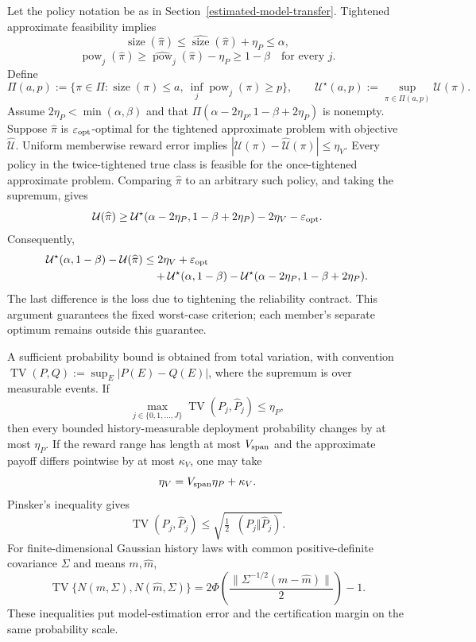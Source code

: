 \documentclass[11pt]{article}
\numberwithin{equation}{section}
\theoremstyle{plain}
\theoremstyle{definition}
\theoremstyle{remark}
\DeclareMathOperator{\KL}{D_{\mathrm{KL}}}
\begin{document}
Let the policy notation be as in Section~\ref{estimated-model-transfer}.  Tightened approximate feasibility implies
\[
\operatorname{size}(\widehat\pi)
\le
\widehat{\operatorname{size}}(\widehat\pi)+\eta_P
\le\alpha,
\]
\[
\operatorname{pow}_j(\widehat\pi)
\ge
\widehat{\operatorname{pow}}_j(\widehat\pi)-\eta_P
\ge1-\beta
\quad\text{for every }j.
\]
Define
\[
\Pi(a,p):=\{\pi\in\Pi:\operatorname{size}(\pi)\le a,
\ \inf_j\operatorname{pow}_j(\pi)\ge p\},
\qquad
\mathcal U^\star(a,p):=\sup_{\pi\in\Pi(a,p)}\mathcal U(\pi).
\]
Assume $2\eta_P<\min(\alpha,\beta)$ and that
$\Pi(\alpha-2\eta_P,1-\beta+2\eta_P)$ is nonempty.
Suppose $\widehat\pi$ is $\varepsilon_{\rm opt}$-optimal for the tightened approximate problem with objective $\widehat{\mathcal U}$. Uniform memberwise reward error implies
$|\mathcal U(\pi)-\widehat{\mathcal U}(\pi)|\le\eta_V$.
Every policy in the twice-tightened true class is feasible for the once-tightened approximate problem. Comparing $\widehat\pi$ to an arbitrary such policy, and taking the supremum, gives
\[
\mathcal U(\widehat\pi)
\ge\mathcal U^\star(\alpha-2\eta_P,1-\beta+2\eta_P)
-2\eta_V-\varepsilon_{\rm opt}.
\]
Consequently,
\begin{align*}
\mathcal U^\star(\alpha,1-\beta)-\mathcal U(\widehat\pi)
&\le 2\eta_V+\varepsilon_{\rm opt}\\
&\quad+\mathcal U^\star(\alpha,1-\beta)
-\mathcal U^\star(\alpha-2\eta_P,1-\beta+2\eta_P).
\end{align*}
The last difference is the loss due to tightening the reliability contract. This argument guarantees the fixed worst-case criterion; each member's separate optimum remains outside this guarantee.

A sufficient probability bound is obtained from total variation, with convention $\operatorname{TV}(P,Q):=\sup_E|P(E)-Q(E)|$, where the supremum is over measurable events. If
\[
\max_{j\in\{0,1,\ldots,J\}}\operatorname{TV}(P_j,\widehat P_j)\le\eta_P,
\]
then every bounded history-measurable deployment probability changes by at most $\eta_P$.  If the reward range has length at most $V_{\rm span}$ and the approximate payoff differs pointwise by at most $\kappa_V$, one may take
\[
\eta_V=V_{\rm span}\eta_P+\kappa_V.
\]
Pinsker's inequality gives
\[
\operatorname{TV}(P_j,\widehat P_j)
\le
\sqrt{\tfrac12\KL(P_j\Vert\widehat P_j)}.
\]
For finite-dimensional Gaussian history laws with common positive-definite covariance $\Sigma$ and means $m,\widehat m$,
\[
\operatorname{TV}\{N(m,\Sigma),N(\widehat m,\Sigma)\}
=
2\Phi\!\left(
\frac{\|\Sigma^{-1/2}(m-\widehat m)\|}{2}
\right)-1.
\]
These inequalities put model-estimation error and the certification margin on the same probability scale.
\end{document}
